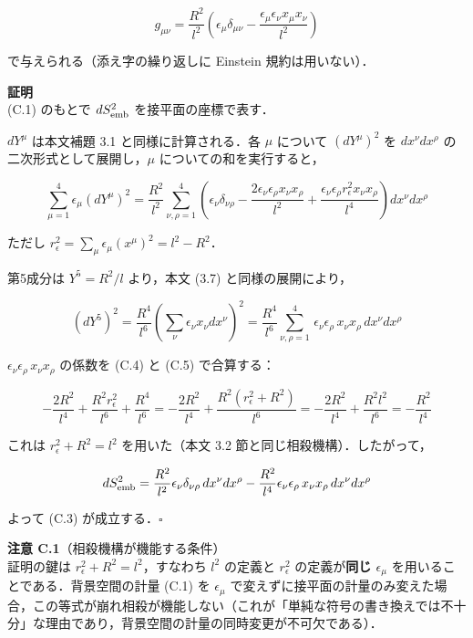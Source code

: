 \documentclass[a4paper,11pt]{ltjsarticle}
\theoremstyle{definition}
\begin{document}
\[g_{\mu\nu} = \frac{R^2}{l^2}\left(\epsilon_\mu \delta_{\mu\nu} - \frac{\epsilon_\mu \epsilon_\nu x_\mu x_\nu}{l^2}\right) \tag{C.3}\]

で与えられる（添え字の繰り返しに Einstein 規約は用いない）．

\textbf{証明}\\
(C.1) のもとで \(dS^2_{\rm emb}\) を接平面の座標で表す．

\(dY^\mu\) は本文補題 3.1 と同様に計算される．各 \(\mu\) について \((dY^\mu)^2\) を \(dx^\nu dx^\rho\) の二次形式として展開し，\(\mu\) についての和を実行すると，

\[\sum_{\mu=1}^4 \epsilon_\mu (dY^\mu)^2 = \frac{R^2}{l^2} \sum_{\nu,\rho=1}^4 \left(\epsilon_\nu \delta_{\nu\rho} - \frac{2\epsilon_\nu \epsilon_\rho x_\nu x_\rho}{l^2} + \frac{\epsilon_\nu \epsilon_\rho r_\epsilon^2 x_\nu x_\rho}{l^4}\right) dx^\nu dx^\rho \tag{C.4}\]

ただし \(r_\epsilon^2 = \sum_\mu \epsilon_\mu (x^\mu)^2 = l^2 - R^2\)．

第5成分は \(Y^5 = R^2/l\) より，本文 (3.7) と同様の展開により，

\[(dY^5)^2 = \frac{R^4}{l^6}\left(\sum_\nu \epsilon_\nu x_\nu dx^\nu\right)^2 = \frac{R^4}{l^6}\sum_{\nu,\rho=1}^4\,\epsilon_\nu \epsilon_\rho\, x_\nu x_\rho\, dx^\nu dx^\rho \tag{C.5}\]

\(\epsilon_\nu \epsilon_\rho\, x_\nu x_\rho\) の係数を (C.4) と (C.5) で合算する：

\[-\frac{2R^2}{l^4} + \frac{R^2 r_\epsilon^2}{l^6} + \frac{R^4}{l^6} = -\frac{2R^2}{l^4} + \frac{R^2(r_\epsilon^2 + R^2)}{l^6} = -\frac{2R^2}{l^4} + \frac{R^2 l^2}{l^6} = -\frac{R^2}{l^4}\]

これは \(r_\epsilon^2 + R^2 = l^2\) を用いた（本文 3.2 節と同じ相殺機構）．したがって，

\[dS^2_{\rm emb} = \frac{R^2}{l^2}\epsilon_\nu \delta_{\nu\rho}\, dx^\nu dx^\rho - \frac{R^2}{l^4}\epsilon_\nu \epsilon_\rho\, x_\nu x_\rho\, dx^\nu dx^\rho\]

よって (C.3) が成立する．\(\square\)

\textbf{注意 C.1}（相殺機構が機能する条件）\\
証明の鍵は \(r_\epsilon^2 + R^2 = l^2\)，すなわち \(l^2\) の定義と \(r_\epsilon^2\) の定義が\textbf{同じ \(\epsilon_\mu\)} を用いることである．背景空間の計量 (C.1) を \(\epsilon_\mu\) で変えずに接平面の計量のみ変えた場合，この等式が崩れ相殺が機能しない（これが「単純な符号の書き換えでは不十分」な理由であり，背景空間の計量の同時変更が不可欠である）．
\end{document}
